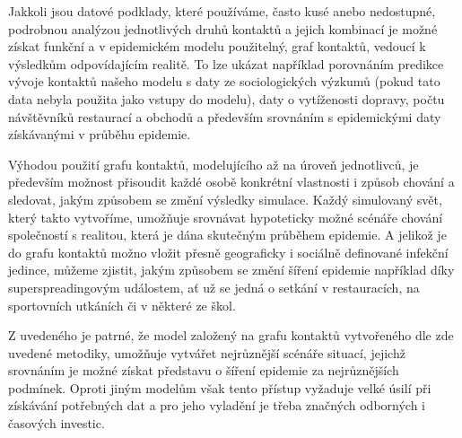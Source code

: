Jakkoli jsou datové podklady, které používáme, často kusé anebo nedostupné, podrobnou analýzou jednotlivých druhů kontaktů a jejich kombinací je možné získat funkční a v epidemickém modelu použitelný, graf kontaktů, vedoucí k výsledkům odpovídajícím realitě. To lze ukázat například porovnáním predikce vývoje kontaktů našeho modelu s daty ze sociologických výzkumů (pokud tato data nebyla použita jako vstupy do modelu), daty o vytíženosti dopravy, počtu návštěvníků restaurací a obchodů a především srovnáním s epidemickými daty získávanými v průběhu epidemie. 

Výhodou použití grafu kontaktů, modelujícího až na úroveň jednotlivců, je především možnost přisoudit každé osobě konkrétní vlastnosti i způsob chování a sledovat, jakým způsobem se změní výsledky simulace. Každý simulovaný svět, který takto vytvoříme, umožňuje srovnávat hypoteticky možné scénáře chování společností s realitou, která je dána skutečným průběhem epidemie.  A jelikož je do grafu kontaktů možno vložit přesně geograficky i sociálně definované infekční jedince, můžeme zjistit, jakým způsobem se změní šíření epidemie například díky superspreadingovým událostem, ať už se jedná o  setkání v restauracích, na sportovních utkáních či v některé ze škol. 

Z uvedeného je patrné, že model založený na grafu kontaktů vytvořeného dle zde uvedené metodiky, umožňuje vytvářet nejrůznější scénáře situací, jejichž srovnáním je možné získat představu o šíření epidemie za nejrůznějších podmínek. Oproti jiným modelům však tento přístup vyžaduje velké úsilí při získávání potřebných dat a pro jeho vyladění je třeba značných odborných i časových investic.




